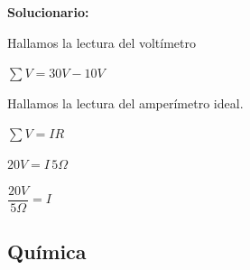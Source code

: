 \begin{enumerate}[resume]
	\vspace{2mm}
	\textbf{Solucionario:}
	
	Hallamos la lectura del voltímetro
	
	$\sum V=30V-10V$
	
	
	Hallamos la lectura del amperímetro ideal.
	
	$\sum V=IR$
	
	$20V=I\,5\Omega$
	
	$\dfrac{20V}{5\Omega}=I$
	
	
	
	\vspace{6mm}
	
\end{enumerate}






\subsection*{Química}

